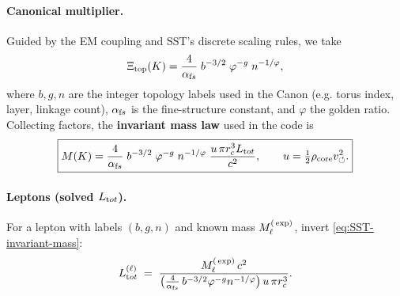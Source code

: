 \documentclass[10pt,reprint,aps,onecolumn,nofootinbib]{revtex4-2}
\begin{document}
    \paragraph{Canonical multiplier.}
        Guided by the EM coupling and SST’s discrete scaling rules, we take
        \[
            \Xi_{\text{top}}(K)=\frac{4}{\alpha_{\textrm fs}}\;b^{-3/2}\;\varphi^{-g}\;n^{-1/\varphi},
        \]
        where $b,g,n$ are the integer topology labels used in the Canon (e.g. torus index, layer, linkage count), $\alpha_{\textrm fs}$ is the fine-structure constant, and $\varphi$ the golden ratio. Collecting factors, the \textbf{invariant mass law} used in the code is
        \begin{equation*}
            \boxed{M(K)=\frac{4}{\alpha_{\textrm fs}}\;b^{-3/2}\;\varphi^{-g}\;n^{-1/\varphi}\;
            \frac{u\,\pi r_c^3 L_{\textrm tot}}{c^2},
                \qquad
                u=\tfrac{1}{2}\rho_{\text{core}}v_{\circlearrowleft}^2.
            }\label{eq:SST-invariant-mass}
        \end{equation*}

    \paragraph{Leptons (solved $L_{\textrm tot}$).}
        For a lepton with labels $(b,g,n)$ and known mass $M_\ell^{\textrm(\exp)}$, invert \eqref{eq:SST-invariant-mass}:
        \[
            L_{\textrm tot}^{(\ell)} \;=\;
            \frac{M_\ell^{\textrm(\exp)}\,c^2}{\big(\tfrac{4}{\alpha_{\textrm fs}}\,b^{-3/2}\varphi^{-g}n^{-1/\varphi}\big)\,u\,\pi r_c^3}.
        \]
\end{document}
